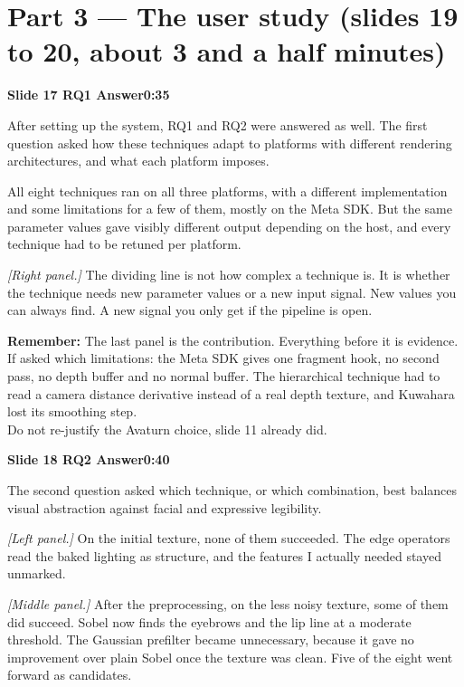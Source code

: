 \documentclass[11pt,a4paper]{article}
\newcommand{\slidehead}[3]{%
  \needspace{5\baselineskip}
  \vspace{0.9em}
  \noindent\colorbox{knblue}{\parbox{0.978\textwidth}{\vspace{1pt}\color{white}\textbf{Slide #1 \quad #2}\hfill\textbf{#3}\vspace{1pt}}}
  \vspace{0.35em}\par}
\newcommand{\remind}[1]{%
  \vspace{0.15em}
  \noindent\colorbox{knlight}{\parbox{0.972\textwidth}{\small\color{knblue}\textbf{Remember:} #1}}
  \vspace{0.2em}\par}
\newcommand{\pointto}[1]{{\color{knaccent}\textit{[#1]}}}
\begin{document}
\section*{\color{knblue}Part 3 — The user study (slides 19 to 20, about 3 and a half minutes)}

\slidehead{17}{RQ1 Answer}{0:35}

After setting up the system, RQ1 and RQ2 were answered as well. The first question asked how these techniques adapt to platforms with different rendering architectures, and what each platform imposes.

All eight techniques ran on all three platforms, with a different implementation and some limitations for a few of them, mostly on the Meta SDK. But the same parameter values gave visibly different output depending on the host, and every technique had to be retuned per platform.

\pointto{Right panel.} The dividing line is not how complex a technique is. It is whether the technique needs new parameter values or a new input signal. New values you can always find. A new signal you only get if the pipeline is open.

\remind{The last panel is the contribution. Everything before it is evidence.\\[0.4em] If asked which limitations: the Meta SDK gives one fragment hook, no second pass, no depth buffer and no normal buffer. The hierarchical technique had to read a camera distance derivative instead of a real depth texture, and Kuwahara lost its smoothing step.\\[0.4em] Do not re-justify the Avaturn choice, slide 11 already did.}

\slidehead{18}{RQ2 Answer}{0:40}

The second question asked which technique, or which combination, best balances visual abstraction against facial and expressive legibility.

\pointto{Left panel.} On the initial texture, none of them succeeded. The edge operators read the baked lighting as structure, and the features I actually needed stayed unmarked.

\pointto{Middle panel.} After the preprocessing, on the less noisy texture, some of them did succeed. Sobel now finds the eyebrows and the lip line at a moderate threshold. The Gaussian prefilter became unnecessary, because it gave no improvement over plain Sobel once the texture was clean. Five of the eight went forward as candidates.
\end{document}
